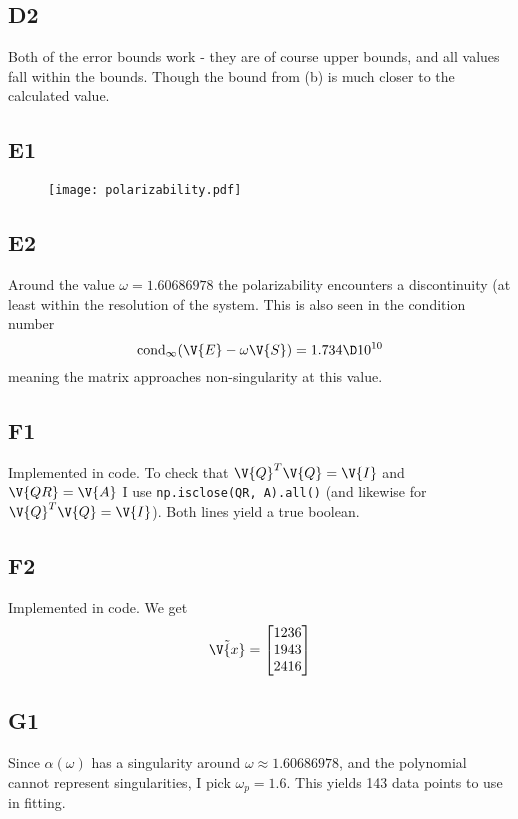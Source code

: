 \documentclass[a4paper,10pt]{article}
\begin{document}
	\subsection*{D2}
	Both of the error bounds work - they are of course upper bounds, and all values fall within the bounds. Though the bound from (b) is much closer to the calculated value.
	
	\subsection*{E1}
	\begin{figure}[H]
		\centering
		\texttt{[image: polarizability.pdf]}
		\caption{}
		\label{fig:polarizability}
	\end{figure}
	
	
	\subsection*{E2}
	Around the value $ \omega=1.60686978 $ the polarizability encounters a discontinuity (at least within the resolution of the system. This is also seen in the condition number
	\begin{equation}\label{key}
		\text{cond}_{\infty} (\V{E}-\omega \V{S}) = 1.734 \D10^{10}
	\end{equation}
	meaning the matrix approaches non-singularity at this value.
	
	\subsection*{F1}
	Implemented in code. To check that $ \V{Q}^T \V{Q} = \V{I} $ and $ \V{QR}=\V{A} $ I use \texttt{np.isclose(QR, A).all()} (and likewise for $ \V{Q}^T \V{Q}=\V{I} $). Both lines yield a true boolean.
	
	\subsection*{F2}
	Implemented in code. We get
	\begin{equation}\label{key}
		\tilde{\V{x}} = \begin{bmatrix}
		1236 \\ 1943 \\ 2416
		\end{bmatrix}
	\end{equation}
	
	\subsection*{G1}
	Since $ \alpha(\omega) $ has a singularity around $ \omega \approx 1.60686978 $, and the polynomial cannot represent singularities, I pick $ \omega_p = 1.6 $. This yields 143 data points to use in fitting.
	
\end{document}
